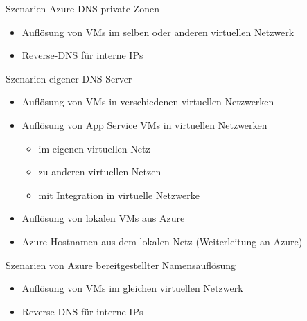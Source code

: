 \begin{flashcard}[]{Szenarien Azure DNS private Zonen}
  \begin{itemize}
    \item Auflösung von VMs im selben oder anderen virtuellen Netzwerk
    \item Reverse-DNS für interne IPs
  \end{itemize}
\end{flashcard}

\begin{flashcard}[]{Szenarien eigener DNS-Server}
  \begin{itemize}
    \item Auflösung von VMs in verschiedenen virtuellen Netzwerken
    \item Auflösung von App Service VMs in virtuellen Netzwerken
      \begin{itemize}
        \item im eigenen virtuellen Netz
        \item zu anderen virtuellen Netzen
        \item mit Integration in virtuelle Netzwerke
      \end{itemize}
    \item Auflösung von lokalen VMs aus Azure
    \item Azure-Hostnamen aus dem lokalen Netz\newline
      (Weiterleitung an Azure)
  \end{itemize}
\end{flashcard}

\begin{flashcard}[]{Szenarien von Azure bereitgestellter Namensauflösung}
  \begin{itemize}
    \item Auflösung von VMs im gleichen virtuellen Netzwerk
    \item Reverse-DNS für interne IPs
  \end{itemize}
\end{flashcard}

